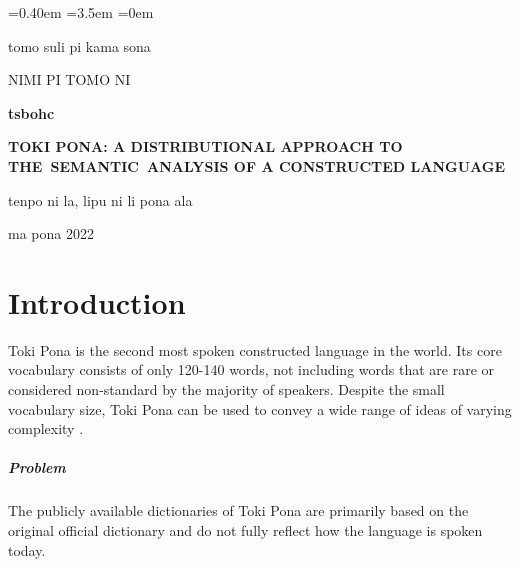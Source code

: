\documentclass[14pt, a4paper]{extreport}
\begin{document}
\sloppy
{}\font=0.40em %
\font=3.5em %
\font=0em %

\renewcommand{\contentsname}{\let\clearpage\relax\chapter*{Contents}} %


\begin{titlepage}
  \begin{center}
    tomo suli pi kama sona

    NIMI PI TOMO NI

    \vfill

    \textbf{tsbohc}

    \large
    \textbf{TOKI PONA: A DISTRIBUTIONAL APPROACH TO THE~SEMANTIC~ANALYSIS OF A CONSTRUCTED LANGUAGE}

    \normalsize

    \bigskip
    \bigskip
    \bigskip
    \bigskip
    tenpo ni la, lipu ni li pona ala

    \bigskip


    \vfill
    ma pona 2022

  \end{center}
\end{titlepage}
\setcounter{page}{2}
\restoregeometry
\tableofcontents

\chapter{Introduction}

Toki Pona is the second most spoken constructed language in the world. Its core vocabulary consists of only 120-140 words, not including words that are rare or considered non-standard by the majority of speakers. Despite the small vocabulary size, Toki Pona can be used to convey a wide range of ideas of varying complexity \parencite{iso}.
\paragraph{Problem}
The publicly available dictionaries of Toki Pona are primarily based on the original official dictionary \parencite[125-134]{pu} and do not fully reflect how the language is spoken today.
\end{document}
